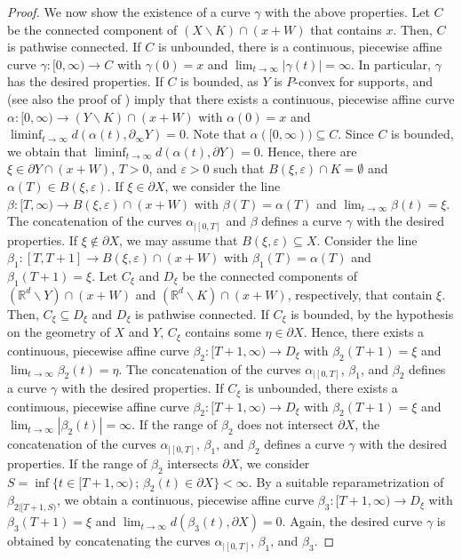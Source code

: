 \documentclass[12pt]{amsart}
\newcommand{\R}{\mathbb{R}}
\theoremstyle{definition}
\theoremstyle{remark}
\numberwithin{equation}{section}
\begin{document}
\begin{proof}
We now show the existence of a  curve $\gamma$ with the above properties. Let $C$ be the  connected component of $(X\backslash K)\cap (x+W)$ that contains $x$. Then, $C$ is pathwise connected. If $C$ is unbounded, there is a continuous, piecewise affine curve $\gamma:[0,\infty)\rightarrow C$ with $\gamma(0)=x$ and $\lim_{t\rightarrow\infty}|\gamma(t)|=\infty$. In particular, $\gamma$ has the desired properties. If $C$ is bounded, as $Y$ is $P$-convex for supports,  \cite[Theorem 10.8.5]{HoermanderPDO2} and \cite[Lemma 4]{Kalmes19} (see also the proof of \cite[Theorem 1]{Kalmes21}) imply that there exists a continuous, piecewise affine curve $\alpha:[0,\infty)\rightarrow(Y\backslash K)\cap(x+W)$ with $\alpha(0)=x$ and $\liminf_{t\rightarrow\infty}d(\alpha(t),\partial_\infty Y)=0$. Note that $\alpha([0,\infty))\subseteq C$. Since $C$ is bounded, we obtain that  $\liminf_{t\rightarrow\infty}d(\alpha(t),\partial Y)=0$. Hence, there are $\xi\in \partial Y \cap(x+W)$, $T>0$, and $\varepsilon>0$ such that $B(\xi,\varepsilon)\cap K=\emptyset$ and $\alpha(T)\in B(\xi,\varepsilon)$.  If $\xi\in\partial X$, we consider the  line  $\beta:[T,\infty)\rightarrow B(\xi, \varepsilon) \cap(x+W)$  with $\beta(T)=\alpha(T)$ and $\lim_{t\rightarrow\infty}\beta(t)=\xi$. The concatenation of the curves $\alpha_{|[0,T]}$ and $\beta$  defines a curve $\gamma$ with the desired properties. If $\xi\notin\partial X$, we may assume that $B(\xi,\varepsilon)\subseteq X$. Consider the line $\beta_1:[T,T+1]\rightarrow B(\xi, \varepsilon) \cap(x+W)$  with $\beta_1(T)=\alpha(T)$ and $\beta_1(T+1)=\xi$. Let $C_\xi$ and $D_\xi$ be the connected components of $(\R^d\backslash Y)\cap(x+W)$ and $(\R^d\backslash K)\cap(x+W)$, respectively, that contain $\xi$. Then, $C_\xi\subseteq D_\xi$ and $D_\xi$ is pathwise connected.  If $C_\xi$ is bounded,  by the hypothesis on the geometry of $X$ and $Y$, $C_\xi$ contains some $\eta\in\partial X$. Hence, there exists a continuous, piecewise affine curve $\beta_2:[T+1,\infty)\rightarrow D_\xi$ with $\beta_2(T+1)=\xi$ and $\lim_{t\rightarrow\infty}\beta_2(t)=\eta$. The concatenation of the curves $\alpha_{|[0,T]}$, $\beta_1$, and $\beta_2$ defines a curve $\gamma$ with the desired properties. If $C_\xi$ is unbounded,  there exists a continuous, piecewise affine curve $\beta_2:[T+1,\infty)\rightarrow D_\xi$ with $\beta_2(T+1)=\xi$ and $\lim_{t\rightarrow\infty}|\beta_2(t)|=\infty$. If the range of $\beta_2$ does not intersect $\partial X$, the concatenation of the curves $\alpha_{|[0,T]}$, $\beta_1$, and $\beta_2$ defines a curve $\gamma$ with the desired properties. If the range of $\beta_2$ intersects $\partial X$, we consider $S=\inf\{t\in[T+1,\infty)\,;\,\beta_2(t)\in\partial X\} < \infty$.  By a suitable reparametrization of $\beta_{2|[T+1,S)}$, we obtain a continuous, piecewise affine curve $\beta_3:[T+1,\infty)\rightarrow D_\xi$ with $\beta_3(T+1)=\xi$ and $\lim_{t\rightarrow\infty}d(\beta_3(t),\partial X)=0$. Again, the desired curve $\gamma$ is obtained by concatenating the curves $\alpha_{|[0,T]}$, $\beta_1$, and $\beta_3$.
\end{proof}
\end{document}
